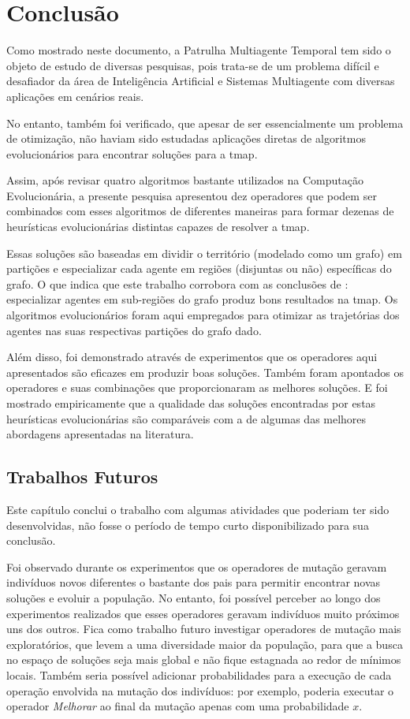 \chapter{Conclusão}
\label{conclusao_final}

Como mostrado neste documento, a Patrulha Multiagente Temporal tem sido o objeto 
de estudo de diversas pesquisas, pois trata-se de um problema difícil e 
desafiador da área de Inteligência Artificial e Sistemas Multiagente com 
diversas aplicações em cenários reais.

No entanto, também foi verificado, que apesar de ser essencialmente um problema 
de otimização, não haviam sido estudadas aplicações diretas de algoritmos 
evolucionários para encontrar soluções para a \ac{tmap}.

Assim, após revisar quatro algoritmos bastante utilizados na Computação 
Evolucionária, a presente pesquisa apresentou dez operadores que podem ser 
combinados com esses algoritmos de diferentes maneiras para formar dezenas de 
heurísticas evolucionárias distintas capazes de resolver a \ac{tmap}.

Essas soluções são baseadas em dividir o território (modelado como um grafo) em 
partições e especializar cada agente em regiões (disjuntas ou não) específicas 
do grafo. O que indica que este trabalho corrobora com as conclusões de 
\citep{1373634}: especializar agentes em sub-regiões do grafo produz bons 
resultados na \ac{tmap}. Os algoritmos evolucionários foram aqui empregados para 
otimizar as trajetórias dos agentes nas suas respectivas partições do grafo dado.

Além disso, foi demonstrado através de experimentos que os operadores aqui 
apresentados são eficazes em produzir boas soluções. Também foram apontados 
os operadores e suas combinações que proporcionaram as melhores soluções. 
E foi mostrado empiricamente que a qualidade das soluções encontradas por estas 
heurísticas evolucionárias são comparáveis com a de algumas das melhores 
abordagens apresentadas na literatura.

\section{Trabalhos Futuros}

Este capítulo conclui o trabalho com algumas atividades que poderiam ter sido 
desenvolvidas, não fosse o período de tempo curto disponibilizado para sua 
conclusão.

Foi observado durante os experimentos que os operadores de mutação geravam 
indivíduos novos diferentes o bastante dos pais para permitir encontrar novas 
soluções e evoluir a população. No entanto, foi possível perceber ao longo dos 
experimentos realizados que esses operadores geravam indivíduos muito próximos 
uns dos outros. Fica como trabalho futuro investigar operadores de mutação mais 
exploratórios, que levem a uma diversidade maior da população, para que a busca 
no espaço de soluções seja mais global e não fique estagnada ao redor de mínimos 
locais. Também seria possível adicionar probabilidades para a execução de cada 
operação envolvida na mutação dos indivíduos: por exemplo, poderia executar o 
operador \textit{Melhorar} ao final da mutação apenas com uma probabilidade $x$.

